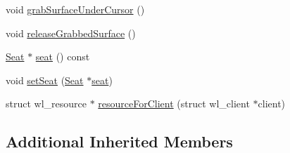 \begin{DoxyCompactItemize}
\item 
void \hyperlink{classmotorcar_1_1SixDOFPointingDevice_a9b55d485a1870d9e50aa85ac3396252c}{grab\-Surface\-Under\-Cursor} ()
\item 
void \hyperlink{classmotorcar_1_1SixDOFPointingDevice_a058f434cd85dc2b722f752122e6ce49f}{release\-Grabbed\-Surface} ()
\item 
\hyperlink{classmotorcar_1_1Seat}{Seat} $\ast$ \hyperlink{classmotorcar_1_1SixDOFPointingDevice_a296fe215aeb4ae2e8724c877aabc874f}{seat} () const 
\item 
void \hyperlink{classmotorcar_1_1SixDOFPointingDevice_a1f97741dbf9f49b6b071558ac3f56b92}{set\-Seat} (\hyperlink{classmotorcar_1_1Seat}{Seat} $\ast$\hyperlink{classmotorcar_1_1SixDOFPointingDevice_a296fe215aeb4ae2e8724c877aabc874f}{seat})
\item 
struct wl\-\_\-resource $\ast$ \hyperlink{classmotorcar_1_1SixDOFPointingDevice_a091a631f8fa2adfab8d0a7904cd47eb5}{resource\-For\-Client} (struct wl\-\_\-client $\ast$client)
\end{DoxyCompactItemize}
\subsection*{Additional Inherited Members}


